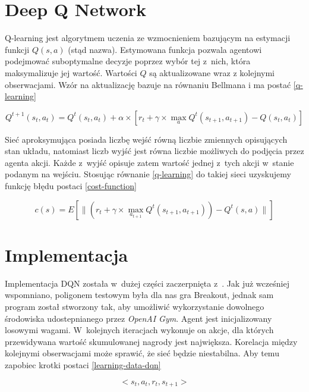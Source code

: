 \section*{Deep Q Network}

Q-learning jest algorytmem uczenia ze wzmocnieniem bazującym na estymacji funkcji $Q(s,a)$ (stąd nazwa). Estymowana funkcja pozwala agentowi podejmować suboptymalne decyzje poprzez wybór tej z~nich, która maksymalizuje jej wartość. Wartości $Q$ są aktualizowane wraz z kolejnymi obserwacjami. Wzór na aktualizację bazuje na równaniu Bellmana i ma postać \ref{q-learning}

\vskip 0.5cm
\begin{equation}
    Q^{t+1}(s_t, a_t) = Q^{t}(s_t, a_t) + \alpha \times \left[r_t + \gamma \times \max_a Q^{t}(s_{t+1}, a_{t+1}) - Q(s_t, a_t)\right]
    \label{q-learning}
\end{equation}
\vskip 0.5cm

Sieć aproksymująca posiada liczbę wejść równą liczbie zmiennych opisujących stan układu, natomiast liczb wyjść jest równa liczbie możliwych do podjęcia przez agenta akcji. Każde z~wyjść opisuje zatem wartość jednej z~tych akcji w~stanie podanym na wejściu. Stosując równanie \ref{q-learning} do takiej sieci uzyskujemy funkcję błędu postaci \ref{cost-function}

\vskip 0.5cm
\begin{equation}
    c(s) = E\left[\|(r_{t} + \gamma \times \max_{a_{t+1}}Q^{t}(s_{t+1},a_{t+1}))-Q^{t}(s,a)\|\right]
    \label{cost-function}
\end{equation}
\vskip 0.5cm

\section*{Implementacja}

Implementacja DQN została w~dużej części zaczerpnięta z~\cite{live-lessons}. Jak już wcześniej wspomniano, poligonem testowym była dla nas gra Breakout, jednak sam program został stworzony tak, aby umożliwić wykorzystanie dowolnego środowiska udostepnianego przez \textit{OpenAI Gym}. Agent jest inicjalizowany losowymi wagami. W~kolejnych iteracjach wykonuje on akcje, dla których przewidywana wartość skumulowanej nagrody jest największa. Korelacja między kolejnymi obserwacjami może sprawić, że sieć będzie niestabilna. Aby temu zapobiec krotki postaci \ref{learning-data-dqn}

\vskip 0.5cm
\begin{equation}
    <s_t, a_t, r_t, s_{t+1}>
    \label{learning-data-dqn}
\end{equation}
\vskip 0.5cm

